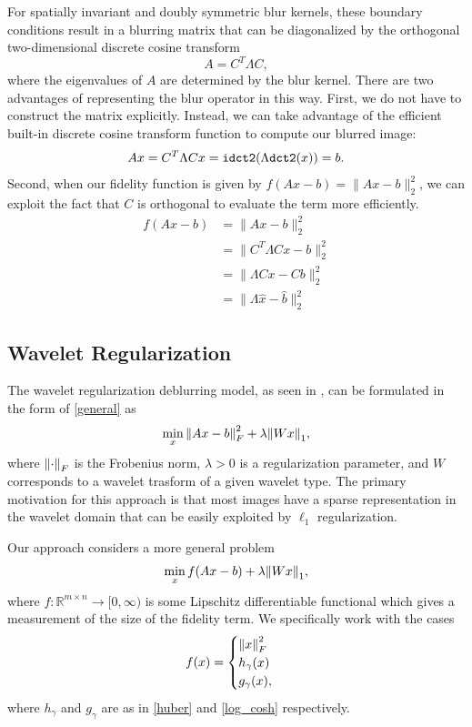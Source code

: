 \documentclass[10pt,a4paper]{article}
\newcommand{\R}{\mathbb{R}}
\begin{document}
For spatially invariant and doubly symmetric blur kernels, these boundary conditions result in a blurring matrix that can be diagonalized by the orthogonal two-dimensional discrete cosine transform
\begin{equation}
A = C^T \Lambda C,
\end{equation}
where the eigenvalues of $A$ are determined by the blur kernel. There are two advantages of representing the blur operator in this way. First, we do not have to construct the matrix explicitly. Instead, we can take advantage of the efficient built-in discrete cosine transform function to compute our blurred image:
\begin{equation}
Ax = C^T \Lambda C x = {\tt idct2}( \Lambda {\tt dct2}(x)) = b.
\end{equation}
Second, when our fidelity function is given by $f(Ax -b) = \| Ax - b \|_2^2$, we can exploit the fact that $C$ is orthogonal to evaluate the term more efficiently. 
\begin{align*}
f(Ax - b) &= \| Ax - b \|_2^2 \\
&= \| C^T \Lambda C x - b \|_2^2 \\
&= \| \Lambda Cx - Cb \|_2^2 \\
&= \| \Lambda \hat{x} - \hat{b} \|_2^2 
\end{align*}

\subsection{Wavelet Regularization}

The wavelet regularization deblurring model, as seen in \cite{FISTA}, can be formulated in the form of \eqref{general} as 
\begin{equation} \label{wavelet_orig}
\min_{x} \norm{ Ax - b }_F^2 + \lambda \norm{Wx}_1 ,
\end{equation}
where $\norm{\cdot}_F$ is the Frobenius norm, $\lambda>0$ is a regularization parameter, and $W$ corresponds to a wavelet trasform of a given wavelet type. The primary motivation for this approach is that most images have a sparse representation in the wavelet domain that can be easily exploited by $\ell_1$ regularization. 

Our approach considers a more general problem
\begin{equation} \label{wavelet}
\min_{x} f(Ax - b ) + \lambda \norm{Wx}_1,
\end{equation}
where $f: \R^{m \times n} \rightarrow [0,\infty)$ is some Lipschitz differentiable functional which gives a measurement of the size of the fidelity term. We specifically work with the cases 
\begin{equation} \label{fidelities}
f(x) = \begin{cases}
\norm{x}_F^2 \\
h_\gamma(x) \\
g_\gamma(x),
\end{cases}
\end{equation}
where $h_\gamma$ and $g_\gamma$ are as in \eqref{huber} and \eqref{log_cosh} respectively. 
\end{document}
